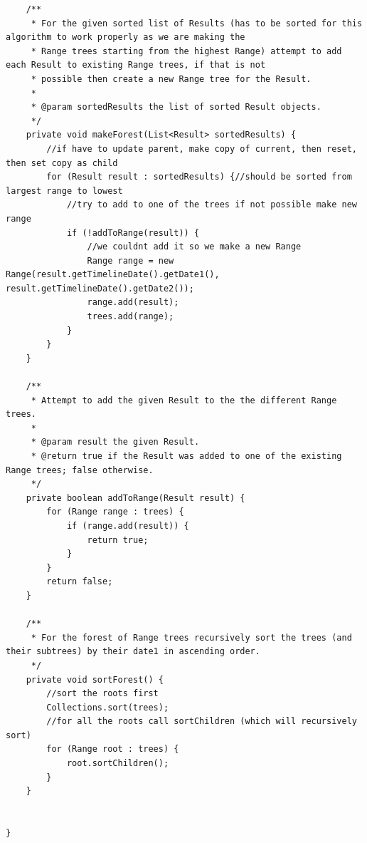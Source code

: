 \begin{lstlisting}
    /**
     * For the given sorted list of Results (has to be sorted for this algorithm to work properly as we are making the
     * Range trees starting from the highest Range) attempt to add each Result to existing Range trees, if that is not
     * possible then create a new Range tree for the Result.
     *
     * @param sortedResults the list of sorted Result objects.
     */
    private void makeForest(List<Result> sortedResults) {
        //if have to update parent, make copy of current, then reset, then set copy as child
        for (Result result : sortedResults) {//should be sorted from largest range to lowest
            //try to add to one of the trees if not possible make new range
            if (!addToRange(result)) {
                //we couldnt add it so we make a new Range
                Range range = new Range(result.getTimelineDate().getDate1(), result.getTimelineDate().getDate2());
                range.add(result);
                trees.add(range);
            }
        }
    }

    /**
     * Attempt to add the given Result to the the different Range trees.
     *
     * @param result the given Result.
     * @return true if the Result was added to one of the existing Range trees; false otherwise.
     */
    private boolean addToRange(Result result) {
        for (Range range : trees) {
            if (range.add(result)) {
                return true;
            }
        }
        return false;
    }

    /**
     * For the forest of Range trees recursively sort the trees (and their subtrees) by their date1 in ascending order.
     */
    private void sortForest() {
        //sort the roots first
        Collections.sort(trees);
        //for all the roots call sortChildren (which will recursively sort)
        for (Range root : trees) {
            root.sortChildren();
        }
    }


}

\end{lstlisting}
